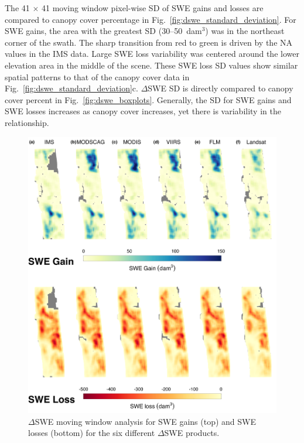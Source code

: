 The 41 $\times$ 41 moving window pixel-wise SD of SWE gains and losses are compared to canopy cover percentage in Fig.~\ref{fig:dswe_standard_deviation}. For SWE gains, the area with the greatest SD (30--50~dam$^{3}$) was in the northeast corner of the swath. The sharp transition from red to green is driven by the NA values in the IMS data. Large SWE loss variability was centered around the lower elevation area in the middle of the scene. These SWE loss SD values show similar spatial patterns to that of the canopy cover data in Fig.~\ref{fig:dswe_standard_deviation}c. $\Delta$SWE SD is directly compared to canopy cover percent in Fig.~\ref{fig:dswe_boxplots}. Generally, the SD for SWE gains and SWE losses increases as canopy cover increases, yet there is variability in the relationship.

\clearpage
\begin{figure}[h]
\centering
\includegraphics[width=\textwidth]{figures/ch4_figs/dswe_mw_full_dam3_v1.png}
\caption{$\Delta$SWE moving window analysis for SWE gains (top) and SWE losses (bottom) for the six different $\Delta$SWE products.}
\label{fig:dswe_moving_window}
\end{figure}



